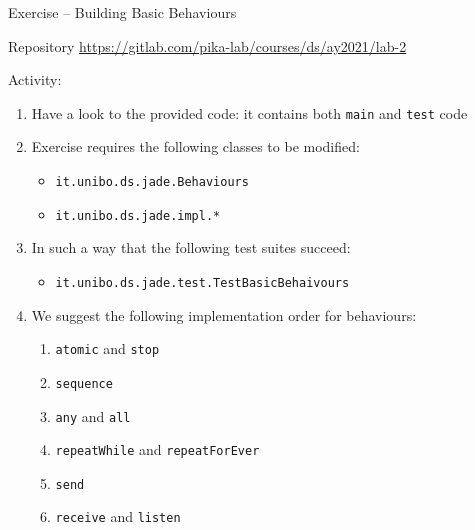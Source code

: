 \documentclass{beamer}\mode<presentation>{\usetheme{AMSCesenaPurpleAndGold}}
\begin{document}
\begin{frame}[c,allowframebreaks]{Exercise \currentExercise{} -- Building Basic Behaviours}

    \begin{block}{Repository}\centering
        \url{https://gitlab.com/pika-lab/courses/ds/ay2021/lab-2}
    \end{block}

    \bigskip

    Activity:
    \medskip
    \begin{enumerate}
        \item Have a look to the provided code: it contains both \texttt{main} and \texttt{test} code

        \medskip

        \item Exercise \currentExercise{} requires the following classes to be modified:
        \begin{itemize}
            \item \texttt{it.unibo.ds.jade.\alert{Behaviours}}
            \item \texttt{it.unibo.ds.jade.\alert{impl.*}}
        \end{itemize}

        \medskip

        \item In such a way that the following test suites succeed:
        \begin{itemize}
            \item \texttt{it.unibo.ds.jade.test.\alert{TestBasicBehaivours}}
        \end{itemize}

        \framebreak

        \item We suggest the following implementation order for behaviours:
        \begin{enumerate}
            \item \texttt{atomic} and \texttt{stop}
            \item \texttt{sequence}
            \item \texttt{any} and \texttt{all}
            \item \texttt{repeatWhile} and \texttt{repeatForEver}
            \item \texttt{send}
            \item \texttt{receive} and \texttt{listen}
        \end{enumerate}


\end{enumerate}
\end{frame}
\end{document}
